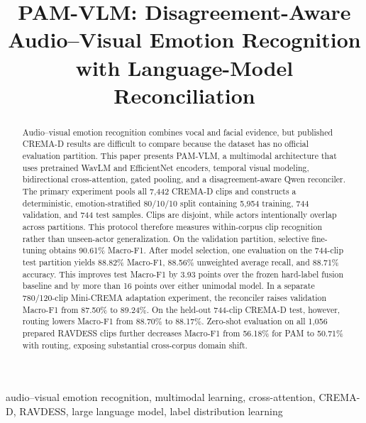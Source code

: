 \documentclass[conference]{IEEEtran}
\begin{document}
\title{PAM-VLM: Disagreement-Aware Audio--Visual Emotion Recognition
with Language-Model Reconciliation}

\author{
}

\maketitle

\begin{abstract}
Audio--visual emotion recognition combines vocal and facial evidence, but
published CREMA-D results are difficult to compare because the dataset has no
official evaluation partition. This paper presents PAM-VLM, a multimodal
architecture that uses pretrained WavLM and EfficientNet encoders, temporal
visual modeling, bidirectional cross-attention, gated pooling, and a
disagreement-aware Qwen reconciler. The primary
experiment pools all 7,442 CREMA-D clips and constructs a deterministic,
emotion-stratified 80/10/10 split containing 5,954 training, 744 validation,
and 744 test samples. Clips are disjoint, while actors intentionally overlap
across partitions. This protocol therefore measures within-corpus clip
recognition rather than unseen-actor generalization. On the validation
partition, selective fine-tuning obtains 90.61\% Macro-F1. After model
selection, one evaluation on the 744-clip test partition yields 88.82\%
Macro-F1, 88.56\% unweighted average recall, and 88.71\% accuracy. This
improves test Macro-F1 by 3.93 points over the frozen hard-label fusion
baseline and by more than 16 points over either unimodal model. In a separate
780/120-clip Mini-CREMA adaptation experiment, the reconciler raises
validation Macro-F1 from 87.50\% to 89.24\%. On the held-out 744-clip
CREMA-D test, however, routing lowers Macro-F1 from 88.70\% to 88.17\%.
Zero-shot evaluation on all 1,056 prepared RAVDESS clips further decreases
Macro-F1 from 56.18\% for PAM to 50.71\% with routing, exposing substantial
cross-corpus domain shift.
\end{abstract}

\begin{IEEEkeywords}
audio--visual emotion recognition, multimodal learning, cross-attention,
CREMA-D, RAVDESS, large language model, label distribution learning
\end{IEEEkeywords}
\end{document}

